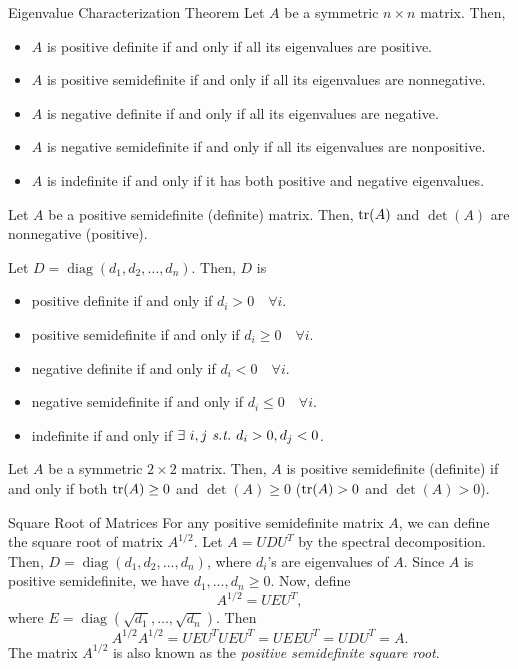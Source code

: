 \begin{thm}{Eigenvalue Characterization Theorem}
	Let $A$ be a symmetric $n\times n$ matrix. Then, 
	\begin{itemize}
		\item $A$ is positive definite if and only if all its eigenvalues are positive.
		\item $A$ is positive semidefinite if and only if all its eigenvalues are nonnegative.
		\item $A$ is negative definite if and only if all its eigenvalues are negative.
		\item $A$ is negative semidefinite if and only if all its eigenvalues are nonpositive.
		\item $A$ is indefinite if and only if it has both positive and negative eigenvalues. 
	\end{itemize}	
\end{thm}
\begin{cor}{}
	Let $A$ be a positive semidefinite (definite) matrix. Then, $\tr(A)$ and $\det(A)$ are nonnegative (positive). 
\end{cor}
\begin{lem}{}
	Let $D=\operatorname{diag}(d_1,d_2,\dots,d_n)$. Then, $D$ is
	\begin{itemize}
		\item positive definite if and only if $d_i>0\quad\forall i$.
		\item positive semidefinite if and only if $d_i\geq0\quad\forall i$.
		\item negative definite if and only if $d_i<0\quad\forall i$.
		\item negative semidefinite if and only if $d_i\leq0\quad\forall i$.
		\item indefinite if and only if $\exists\ i,j\st d_i>0, d_j<0$.
	\end{itemize}
\end{lem}
\begin{prop}{}
	Let $A$ be a symmetric $2\times2$ matrix. Then, $A$ is positive semidefinite (definite) if and only if both $\tr(A)\geq0$ and $\det(A)\geq0$ ($\tr(A)>0$ and $\det(A)>0$).
\end{prop}
\begin{eg}{Square Root of Matrices}
	For any positive semidefinite matrix $A$, we can define the square root of matrix $A^{1/2}$. Let $A=UDU^T$ by the spectral decomposition. Then, $D=\operatorname{diag}(d_1,d_2,\dots,d_n)$, where $d_i$'s are eigenvalues of $A$. Since $A$ is positive semidefinite, we have $d_1,\dots,d_n\geq0$. Now, define \[A^{1/2}=UEU^T,\] where $E=\operatorname{diag}(\sqrt{d_1},\dots,\sqrt{d_n})$. Then \[A^{1/2}A^{1/2}=UEU^TUEU^T=UEEU^T=UDU^T=A.\] The matrix $A^{1/2}$ is also known as the \textit{positive semidefinite square root}.
\end{eg}
